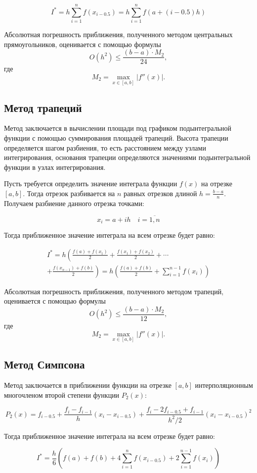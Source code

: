 \documentclass[a4paper, 14pt]{extarticle}
\begin{document}
\[
I^* = h \sum_{i=1}^{n} f(x_{i-0.5}) = h \sum_{i=1}^{n} f(a + (i - 0.5)h)
\]

Абсолютная погрешность приближения, полученного методом центральных прямоугольников, оценивается с помощью формулы
\[
O(h^2) \leq \frac{(b-a) \cdot M_2}{24},
\]
где
\[
M_2 = \max_{x \in [a,b]} |f''(x)|.
\]

\subsection{Метод трапеций}
Метод заключается в вычислении площади под графиком подынтегральной функции 
с помощью суммирования площадей трапеций. Высота трапеции определяется шагом 
разбиения, то есть расстоянием между узлами интегрирования, основания трапеции определяются значениями
подынтегральной функции в узлах интегрирования.

Пусть требуется определить значение интеграла функции $f(x)$ на отрезке $[a, b]$. 
Тогда отрезок разбивается на $n$ равных отрезков длиной $h = \frac{b-a}{n}$. 
Получаем разбиение данного отрезка точками:

\[
x_i = a + ih \quad i = \overline{1,n}
\]

Тогда приближенное значение интеграла на всем отрезке будет равно:

\begin{multline*}
I^* = h \left( \frac{f(a) + f(x_1)}{2} + \frac{f(x_1) + f(x_2)}{2} + \cdots \right. \\
\left. + \frac{f(x_{n-1}) + f(b)}{2} \right) = h \left( \frac{f(a) + f(b)}{2} + \sum_{i=1}^{n-1} f(x_i) \right)
\end{multline*}

Абсолютная погрешность приближения, полученного методом трапеций, оценивается с помощью формулы
\[
O(h^2) \leq \frac{(b-a) \cdot M_2}{12},
\]
где
\[
M_2 = \max_{x \in [a,b]} |f''(x)|.
\]

\subsection{Метод Симпсона}
Метод заключается в приближении функции на отрезке $[a, b]$ интерполяционным 
многочленом второй степени функции $P_2(x)$:

\[
P_2(x) = f_{i-0.5} + \frac{f_i - f_{i-1}}{h} (x_i - x_{i-0.5}) + \frac{f_i - 2f_{i-0.5} + f_{i-1}}{h^2/2} (x_i - x_{i-0.5})^2
\]

Тогда приближенное значение интеграла на всем отрезке будет равно:

\[
I^* = \frac{h}{6} \left( f(a) + f(b) + 4 \sum_{i=1}^{n} f(x_{i-0.5}) + 2 \sum_{i=1}^{n-1} f(x_i) \right)
\]
\end{document}
